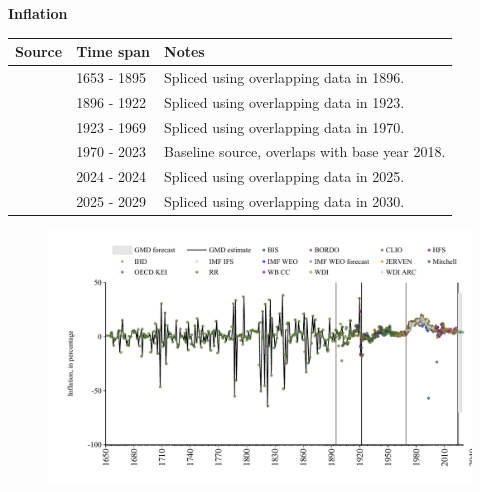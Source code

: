\documentclass[12pt,a4paper,landscape]{article}
\begin{document}
\begin{adjustbox}{max totalsize={\paperwidth}{\paperheight},center}
\begin{minipage}[t][\textheight][t]{\textwidth}
\vspace*{0.5cm}
{}
\begin{center}
{\Large\bfseries Inflation}
\end{center}
\vspace{0.5cm}
\begin{table}[H]
\centering
\small
\begin{tabular}{|l|l|l|}
\hline
\textbf{Source} & \textbf{Time span} & \textbf{Notes} \\
\hline
\rowcolor{white}\cite{CLIO}& 1653 - 1895 &Spliced using overlapping data in 1896. \\
\rowcolor{lightgray}\cite{JERVEN}& 1896 - 1922 &Spliced using overlapping data in 1923. \\
\rowcolor{white}\cite{BIS}& 1923 - 1969 &Spliced using overlapping data in 1970. \\
\rowcolor{lightgray}\cite{WB_CC}& 1970 - 2023 &Baseline source, overlaps with base year 2018. \\
\rowcolor{white}\cite{BIS}& 2024 - 2024 &Spliced using overlapping data in 2025. \\
\rowcolor{lightgray}\cite{IMF_WEO_forecast}& 2025 - 2029 &Spliced using overlapping data in 2030. \\
\hline
\end{tabular}
\end{table}
\begin{figure}[H]
\centering
\includegraphics[width=\textwidth,height=0.6\textheight,keepaspectratio]{graphs/ZAF_infl.pdf}
\end{figure}
\end{minipage}
\end{adjustbox}
\end{document}
